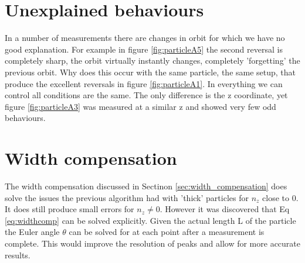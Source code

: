 \section{Unexplained behaviours}
In a number of measurements there are changes in orbit for which we have no good explanation. For example in figure \ref{fig:particleA5} the second reversal is completely sharp, the orbit virtually instantly changes, completely 'forgetting' the previous orbit. Why does this occur with the same particle, the same setup, that produce the excellent reversals in figure \ref{fig:particleA1}. In everything we can control all conditions are the same. The only difference is the z coordinate, yet figure \ref{fig:particleA3} was measured at a similar z and showed very few odd behaviours. 

\section{Width compensation}
The width compensation discussed in Sectinon \ref{sec:width_compensation} does solve the issues the previous algorithm had with 'thick' particles for $n_z$ close to 0. It does still produce small errors for $n_z \neq 0$. However it was discovered that Eq \ref{eq:widthcomp} can be solved explicitly. Given the actual length L of the particle the Euler angle $\theta$ can be solved for at each point after a measurement is complete. This would improve the resolution of peaks and allow for more accurate results.
